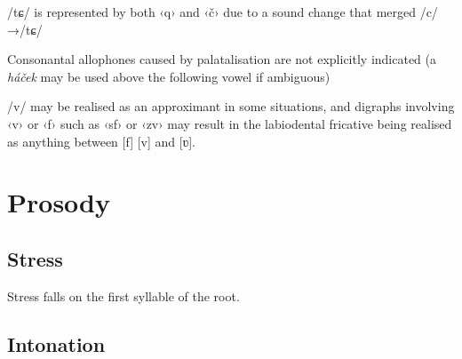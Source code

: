\documentclass[grammar]{subfiles}
\begin{document}
	\begin{itemize*}
	\item	/tɕ/ is represented by both ‹q› and ‹č› due to a sound change that merged /c/→/tɕ/
	\item Consonantal allophones caused by palatalisation are not explicitly indicated (a \emph{háček} may be used above the following vowel if ambiguous)
	\item /v/ may be realised as an approximant in some situations, and digraphs involving ‹v› or ‹f› such as ‹sf› or ‹zv› may result in the labiodental fricative being realised as anything between [f] [v] and [ʋ].
	\end{itemize*}

	\section{Prosody}
	\label{sec:prosody}

	\ToBeWritten

	\subsection{Stress}
	\label{ssec:stress}

	Stress falls on the first syllable of the root. \ToBeWritten

	\subsection{Intonation}
	\label{ssec:intonation}

	\ToBeWritten
\end{document}
